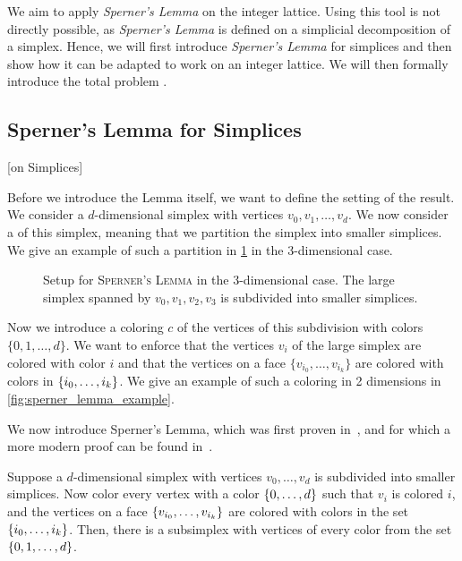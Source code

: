 We aim to apply \textit{Sperner's Lemma} on the integer lattice. Using this tool is not directly possible, as \textit{Sperner's Lemma} is defined on a simplicial decomposition of a simplex. Hence, we will first introduce \textit{Sperner's Lemma} for simplices and then show how it can be adapted to work on an integer lattice. We will then formally introduce the total problem \Sperner.

\subsection{Sperner's Lemma for Simplices}[on Simplices]

Before we introduce the Lemma itself, we want to define the setting of the result. We consider a $d$-dimensional simplex with vertices $v_0, v_1, \dots, v_d$. We now consider a  of this simplex, meaning that we partition the simplex into smaller simplices. We give an example of such a partition in \cref{fig:sperner_setup_example} in the 3-dimensional case.

\begin{figure}[ht]
	\centering
	\caption[Setup for \textsc{Sperner's Lemma}]{Setup for \textsc{Sperner's Lemma} in the 3-dimensional case. The large simplex spanned by $v_0, v_1, v_2, v_3$ is subdivided into smaller simplices.}\label{fig:sperner_setup_example}
\end{figure}

Now we introduce a coloring $c$ of the vertices of this subdivision with colors $\{0, 1, \dots, d\}$. We want to enforce that the vertices $v_i$ of the large simplex are colored with color $i$ and that the vertices on a face $\{v_{i_0}, \dots, v_{i_k}\}$ are colored with colors in $\left\{i_0, \dots, i_k\right\}$. We give an example of such a coloring in 2 dimensions in \cref{fig:sperner_lemma_example}.

We now introduce Sperner's Lemma, which was first proven in~, and for which a more modern proof can be found in~.
\begin{theorem}
	Suppose a $d$-dimensional simplex with vertices $v_0, \dots, v_d$ is subdivided into smaller simplices. Now color every vertex with a color $\left\{0, \dots, d\right\}$ such that $v_i$ is colored $i$, and the vertices on a face $\left\{v_{i_0}, \dots, v_{i_k}\right\}$ are colored with colors in the set $\left\{i_0, \dots, i_k\right\}$. Then, there is a subsimplex with vertices of every color from the set $\left\{0, 1, \dots, d\right\}$.
\end{theorem}

